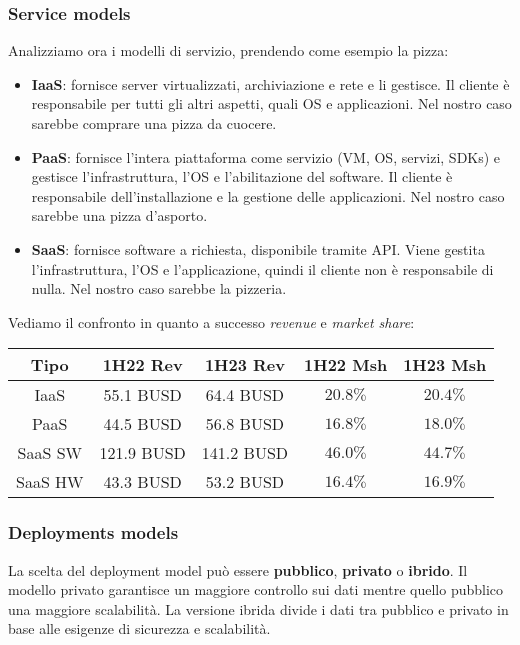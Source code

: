 \subsubsection{Service models}
Analizziamo ora i modelli di servizio, prendendo come esempio la pizza:
\begin{itemize}
	\item \textbf{IaaS}: fornisce server virtualizzati, archiviazione e rete e li gestisce. Il cliente è responsabile per tutti gli altri aspetti, quali OS e applicazioni. Nel nostro caso sarebbe comprare una pizza da cuocere.
	\item \textbf{PaaS}: fornisce l'intera piattaforma come servizio (VM, OS, servizi, SDKs) e gestisce l'infrastruttura, l'OS e l'abilitazione del software. Il cliente è responsabile dell'installazione e la gestione delle applicazioni. Nel nostro caso sarebbe una pizza d'asporto.
	\item \textbf{SaaS}: fornisce software a richiesta, disponibile tramite API. Viene gestita l'infrastruttura, l'OS e l'applicazione, quindi il cliente non è responsabile di nulla. Nel nostro caso sarebbe la pizzeria.
\end{itemize}
Vediamo il confronto in quanto a successo \textit{revenue} e \textit{market share}:
\begin{table}[!h]
	\centering
	\begin{tabular}{|c|c|c|c|c|}
		\hline
		\textbf{Tipo} & \textbf{1H22 Rev} & \textbf{1H23 Rev} & \textbf{1H22 Msh} & \textbf{1H23 Msh}\\
		\hline
		IaaS & 55.1 BUSD & 64.4 BUSD & $20.8\%$ & $20.4 \%$\\
		PaaS & 44.5 BUSD & 56.8 BUSD & $16.8 \%$ & $18.0 \%$\\
		SaaS SW & 121.9 BUSD  & 141.2 BUSD & $46.0\%$ & $44.7 \%$\\
		SaaS HW & 43.3 BUSD & 53.2 BUSD & $16.4\%$ & $16.9\%$\\
		\hline
	\end{tabular}
\end{table}

\subsubsection{Deployments models}
La scelta del deployment model può essere \textbf{pubblico}, \textbf{privato} o \textbf{ibrido}. Il modello privato garantisce un maggiore controllo sui dati mentre quello pubblico una maggiore scalabilità. La versione ibrida divide i dati tra pubblico e privato in base alle esigenze di sicurezza e scalabilità.
